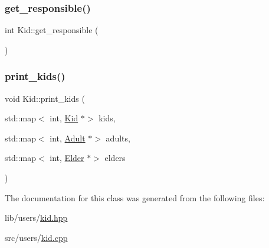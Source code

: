 \subsubsection{\texorpdfstring{get\+\_\+responsible()}{get\_responsible()}}
{\footnotesize\ttfamily int Kid\+::get\+\_\+responsible (\begin{DoxyParamCaption}{ }\end{DoxyParamCaption})\hspace{0.3cm}{\ttfamily [inline]}}

\mbox{\label{class_kid_a1212830ec9b7107178036f767f865e32}} 
\subsubsection{\texorpdfstring{print\+\_\+kids()}{print\_kids()}}
{\footnotesize\ttfamily void Kid\+::print\+\_\+kids (\begin{DoxyParamCaption}\item[{std\+::map$<$ int, \hyperlink{class_kid}{Kid} $\ast$$>$}]{kids,  }\item[{std\+::map$<$ int, \hyperlink{class_adult}{Adult} $\ast$$>$}]{adults,  }\item[{std\+::map$<$ int, \hyperlink{class_elder}{Elder} $\ast$$>$}]{elders }\end{DoxyParamCaption})\hspace{0.3cm}{\ttfamily [static]}}



The documentation for this class was generated from the following files\+:\begin{DoxyCompactItemize}
\item 
lib/users/\hyperlink{kid_8hpp}{kid.\+hpp}\item 
src/users/\hyperlink{kid_8cpp}{kid.\+cpp}\end{DoxyCompactItemize}

